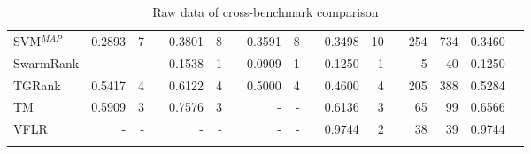 \documentclass{sig-alternate}
\begin{document}
{\begin{longtable}[!hpt]{@{}lrrrrrrrrrrrrrrrr@{}}
SVM$^{MAP}$ & 0.2893 & 7 && 0.3801 & 8 && 0.3591 & 8 && 0.3498 & 10 && 254 & 734 & 0.3460 \\
SwarmRank & - & - && 0.1538 & 1 && 0.0909 & 1 && 0.1250 & 1 && 5 & 40 & 0.1250 \\
TGRank & 0.5417 & 4 && 0.6122 & 4 && 0.5000 & 4 && 0.4600 & 4 && 205 & 388 & 0.5284 \\
TM & 0.5909 & 3 && 0.7576 & 3 && - & - && 0.6136 & 3 && 65 & 99 & 0.6566 \\
VFLR & - & - && - & - && - & - && 0.9744 & 2 && 38 & 39 & 0.9744 \\
\bottomrule
\caption{Raw data of cross-benchmark comparison}
\label{tab:raw_data}
\end{longtable}
}
\end{document}
